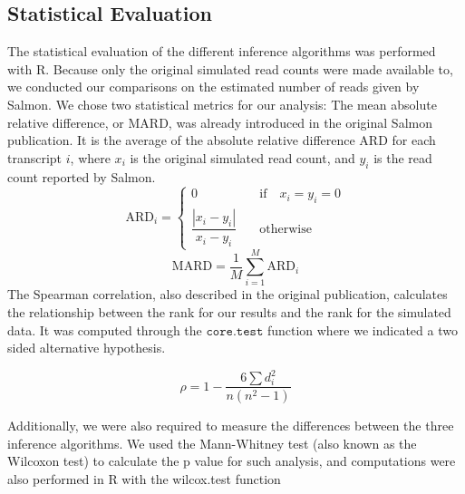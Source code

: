\subsection{Statistical Evaluation}
The statistical evaluation of the different inference algorithms was performed with R. 
Because only the original simulated read counts were made available to, we conducted our comparisons on the estimated number of reads 
given by Salmon. We chose two statistical metrics for our analysis:
The mean absolute relative difference, or $\mathrm{MARD}$, 
was already introduced in the original Salmon publication. 
It is the average of the absolute relative difference $\mathrm{ARD}$ for each transcript $i$, 
where $x_i$ is the original simulated read count, and $y_i$ is the read count reported by Salmon.
\[
    \mathrm{ARD}_i = \begin{cases}
        0 &\quad\text{if}\quad x_i = y_i = 0\\
        \dfrac{\left| x_i-y_i \right| }{x_i-y_i} &\quad\text{otherwise}\quad
    \end{cases}
\]
\[
    \mathrm{MARD} = \frac{1}{M} \sum^{M}_{i = 1}\mathrm{ARD}_i
\]
The Spearman correlation, also described in the original publication, calculates the relationship between the rank for our results and the rank for the simulated data. It was computed through the $\mathtt{core.test}$ function where we indicated a two sided alternative hypothesis.

\[
    \rho = 1 - \dfrac{6 \sum{d^2_i}}{n(n^2-1)}
\]

Additionally, we were also required to measure the differences between the three inference algorithms. 
We used the Mann-Whitney test (also known as the Wilcoxon test) 
to calculate the p value for such analysis, and computations were also performed in R 
with the wilcox.test function
